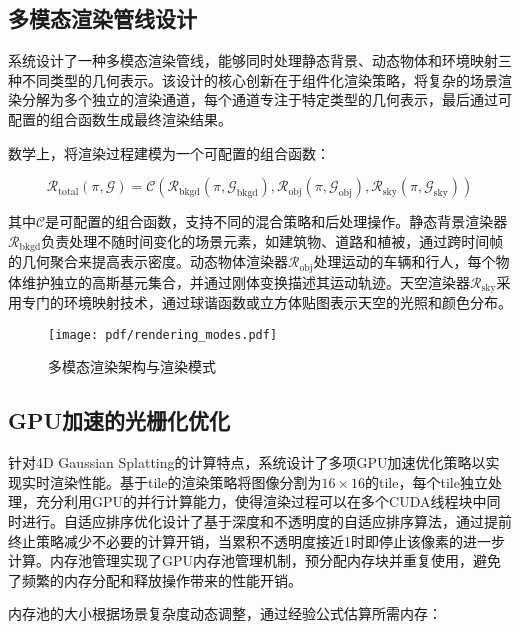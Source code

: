 \subsection{多模态渲染管线设计}

系统设计了一种多模态渲染管线，能够同时处理静态背景、动态物体和环境映射三种不同类型的几何表示。该设计的核心创新在于组件化渲染策略，将复杂的场景渲染分解为多个独立的渲染通道，每个通道专注于特定类型的几何表示，最后通过可配置的组合函数生成最终渲染结果。

数学上，将渲染过程建模为一个可配置的组合函数：

\begin{equation}
\mathcal{R}_{\text{total}}(\pi, \mathcal{G}) = \mathcal{C}(\mathcal{R}_{\text{bkgd}}(\pi, \mathcal{G}_{\text{bkgd}}), \mathcal{R}_{\text{obj}}(\pi, \mathcal{G}_{\text{obj}}), \mathcal{R}_{\text{sky}}(\pi, \mathcal{G}_{\text{sky}}))
\label{eq:modular_rendering}
\end{equation}

其中$\mathcal{C}$是可配置的组合函数，支持不同的混合策略和后处理操作。静态背景渲染器$\mathcal{R}_{\text{bkgd}}$负责处理不随时间变化的场景元素，如建筑物、道路和植被，通过跨时间帧的几何聚合来提高表示密度。动态物体渲染器$\mathcal{R}_{\text{obj}}$处理运动的车辆和行人，每个物体维护独立的高斯基元集合，并通过刚体变换描述其运动轨迹。天空渲染器$\mathcal{R}_{\text{sky}}$采用专门的环境映射技术，通过球谐函数或立方体贴图表示天空的光照和颜色分布。

\begin{figure}[htbp]
  \centering
  \texttt{[image: pdf/rendering\_modes.pdf]}
  \caption{多模态渲染架构与渲染模式}
  \label{fig:rendering-modes}
\end{figure}

\subsection{GPU加速的光栅化优化}

针对4D Gaussian Splatting的计算特点，系统设计了多项GPU加速优化策略以实现实时渲染性能。基于tile的渲染策略将图像分割为$16 \times 16$的tile，每个tile独立处理，充分利用GPU的并行计算能力，使得渲染过程可以在多个CUDA线程块中同时进行。自适应排序优化设计了基于深度和不透明度的自适应排序算法，通过提前终止策略减少不必要的计算开销，当累积不透明度接近1时即停止该像素的进一步计算。内存池管理实现了GPU内存池管理机制，预分配内存块并重复使用，避免了频繁的内存分配和释放操作带来的性能开销。

内存池的大小根据场景复杂度动态调整，通过经验公式估算所需内存：

